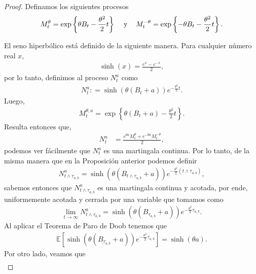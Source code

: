\begin{proof}
Definamos los siguientes procesos
\begin{align*}
M^{\theta}_t = \exp \left\{ \theta B_t - \frac{\theta^2}{2} t \right\} \hspace{0.3cm} \text{ y } \hspace{0.3cm} M^{ - \theta}_t = \exp \left\{ - \theta B_t - \frac{\theta^2}{2} t \right\}.
\end{align*}

El seno hiperbólico está definido de la siguiente manera. Para cualquier número real $x$, 
\begin{align*}
\sinh(x) = \frac{e^{x} - e^{-x}}{2},
\end{align*}
por lo tanto, definimos al proceso $N^{a}_{t}$ como
\begin{align*}
N^{a}_{t} : = \sinh \left( \theta (B_t + a) \right) e^{- \frac{\theta^2}{2} t}.
\end{align*}
Luego, 
\begin{align*}
M_t^{\theta, a} = \exp \left\{ \theta \left( B_t + a \right) - \frac{\theta^2}{2} t \right\}.
\end{align*}
Resulta entonces que, 
\begin{align*}
N^{a}_{t} & = \frac{e^{\theta a} M_t^{\theta} + e^{- \theta a} M_t^{-\theta}}{2},
\end{align*}
podemos ver fácilmente que $N^{a}_{t}$ es una martingala continua. Por lo tanto, de la misma manera que en la Proposición anterior podemos definir
\begin{align*}
N^{a}_{t \wedge \tau_{a, b}} = \sinh \left( \theta (B_{t \wedge \tau_{a, b}} + a) \right) e^{- \frac{\theta^2}{2} (t \wedge \tau_{a, b})},
\end{align*}
sabemos entonces que $N^{a}_{t \wedge \tau_{a, b}}$ es una martingala continua y acotada, por ende, uniformemente acotada y cerrada por una variable que tomamos como
\begin{align*}
\lim_{t \rightarrow \infty} N^{a}_{t \wedge \tau_{a, b}} = \sinh \left( \theta (B_{\tau_{a, b}} + a) \right) e^{- \frac{\theta^2}{2} \tau_{a, b}}.
\end{align*}
Al aplicar el Teorema de Paro de Doob tenemos que
\begin{align}
\mathbb{E} \left[ \sinh \left( \theta (B_{\tau_{a, b}} + a) \right) e^{- \frac{\theta^2}{2} \tau_{a, b}} \right] = \sinh(\theta a). \label{salida_1}
\end{align}
Por otro lado, veamos que
\begin{align}

\end{align}
\end{proof}
